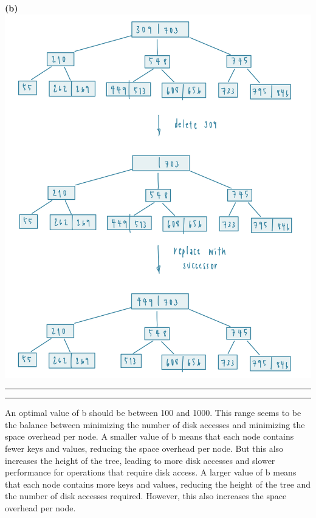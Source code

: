 \documentclass[a4paper, 11pt]{article}
\newcommand{\question}[2] {\vspace{.25in} \hrule\vspace{0.5em}
\noindent{\bf #1: #2} \vspace{0.5em}
\hrule \vspace{.10in}}
\renewcommand{\part}[1] {\vspace{.10in} {\bf (#1)}}
\begin{document}
\part{b} \\
\includegraphics[width=15cm]{p4b}

\question{4}{\textit{B-Tree Speed}}
An optimal value of b should be between 100 and 1000. This range seems to be the balance between minimizing the number of disk accesses and minimizing the space overhead per node.
A smaller value of b means that each node contains fewer keys and values, reducing the space overhead per node. But this also increases the height of the tree, leading to more disk accesses and slower performance for operations that require disk access.
A larger value of b means that each node contains more keys and values, reducing the height of the tree and the number of disk accesses required. However, this also increases the space overhead per node.
\end{document}
